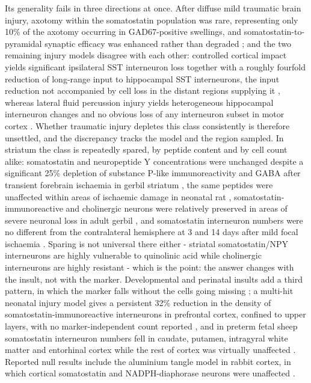 \documentclass[11pt]{article}
\begin{document}
Its generality fails in three directions at once. After diffuse mild traumatic brain injury, axotomy within the somatostatin population was rare, representing only 10\% of the axotomy occurring in GAD67-positive swellings, and somatostatin-to-pyramidal synaptic efficacy was enhanced rather than degraded \citep{Harris2022}; and the two remaining injury models disagree with each other: controlled cortical impact yields significant ipsilateral SST interneuron loss together with a roughly fourfold reduction of long-range input to hippocampal SST interneurons, the input reduction not accompanied by cell loss in the distant regions supplying it \citep{Frankowski2022}, whereas lateral fluid percussion injury yields heterogeneous hippocampal interneuron changes and no obvious loss of any interneuron subset in motor cortex \citep{Carron2019}. Whether traumatic injury depletes this class consistently is therefore unsettled, and the discrepancy tracks the model and the region sampled. In striatum the class is repeatedly spared, by peptide content and by cell count alike: somatostatin and neuropeptide Y concentrations were unchanged despite a significant 25\% depletion of substance P-like immunoreactivity and GABA after transient forebrain ischaemia in gerbil striatum \citep{Uemura1990}, the same peptides were unaffected within areas of ischaemic damage in neonatal rat \citep{Ferriero1988}, somatostatin-immunoreactive and cholinergic neurons were relatively preserved in areas of severe neuronal loss in adult gerbil \citep{Chesselet1990}, and somatostatin interneuron numbers were no different from the contralateral hemisphere at 3 and 14 days after mild focal ischaemia \citep{Katchanov2003}. Sparing is not universal there either - striatal somatostatin/NPY interneurons are highly vulnerable to quinolinic acid while cholinergic interneurons are highly resistant \citep{FigueredoCardenas1998} - which is the point: the answer changes with the insult, not with the marker. Developmental and perinatal insults add a third pattern, in which the marker falls without the cells going missing \citep{Komitova2013}; a multi-hit neonatal injury model gives a persistent 32\% reduction in the density of somatostatin-immunoreactive interneurons in prefrontal cortex, confined to upper layers, with no marker-independent count reported \citep{Lacaille2019}, and in preterm fetal sheep somatostatin interneuron numbers fell in caudate, putamen, intragyral white matter and entorhinal cortex while the rest of cortex was virtually unaffected \citep{Ardalan2019}. Reported null results include the aluminium tangle model in rabbit cortex, in which cortical somatostatin and NADPH-diaphorase neurons were unaffected \citep{Kowall1989}.
\end{document}
